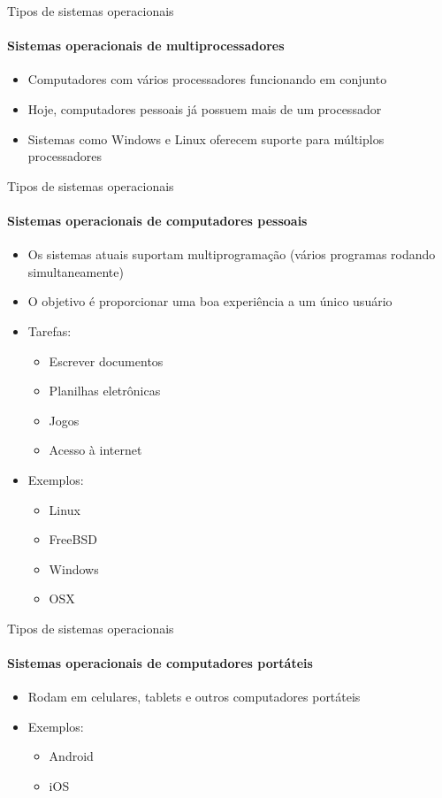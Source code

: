 \documentclass{beamer}
\begin{document}
\begin{frame}{Tipos de sistemas operacionais}
	\framesubtitle{Sistemas operacionais de multiprocessadores}
	\begin{itemize}
		\item Computadores com vários processadores funcionando em conjunto
		\item Hoje, computadores pessoais já possuem mais de um processador
		\item Sistemas como Windows e Linux oferecem suporte para múltiplos processadores
	\end{itemize}
\end{frame}
\begin{frame}{Tipos de sistemas operacionais}
	\framesubtitle{Sistemas operacionais de computadores pessoais}
	\begin{itemize}
		\item Os sistemas atuais suportam multiprogramação (vários programas rodando simultaneamente)
		\item O objetivo é proporcionar uma boa experiência a um único usuário
		\item Tarefas:
		\begin{itemize}
			\item Escrever documentos
			\item Planilhas eletrônicas
			\item Jogos
			\item Acesso à internet
		\end{itemize}
		\item Exemplos:
		\begin{itemize}
			\item Linux
			\item FreeBSD
			\item Windows
			\item OSX
		\end{itemize}
	\end{itemize}
\end{frame}
\begin{frame}{Tipos de sistemas operacionais}
	\framesubtitle{Sistemas operacionais de computadores portáteis}
	\begin{itemize}
		\item Rodam em celulares, tablets e outros computadores portáteis
		\item Exemplos:
		\begin{itemize}
			\item Android
			\item iOS
		\end{itemize}
	\end{itemize}
\end{frame}
\end{document}
